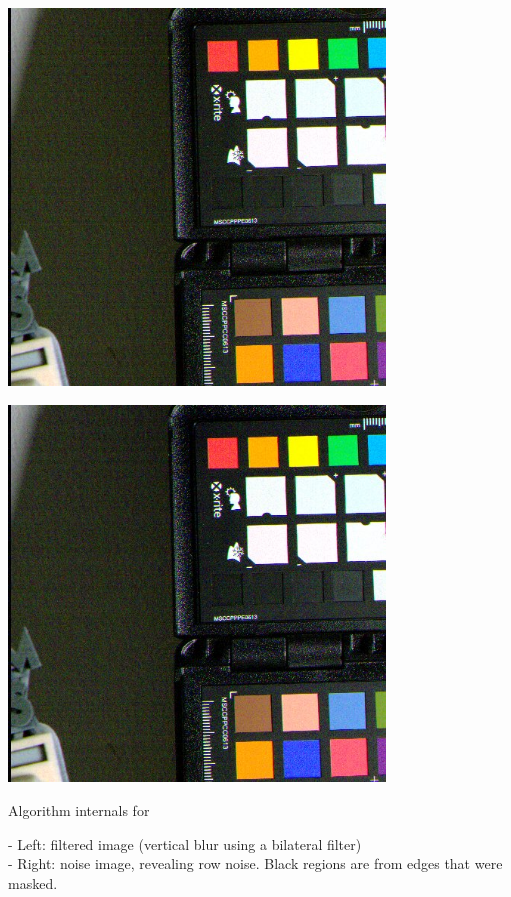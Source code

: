 \begin{center}
\includegraphics[height=10cm]{images/10ms+4-rnfilter1-crop}
\end{center}

\begin{center}
\includegraphics[height=10cm]{images/10ms+4-rnfilter2-crop}
\end{center}

Algorithm internals for 

- Left: filtered image (vertical blur using a bilateral filter)\\
- Right: noise image, revealing row noise. Black regions are from edges that were masked.\\ 

